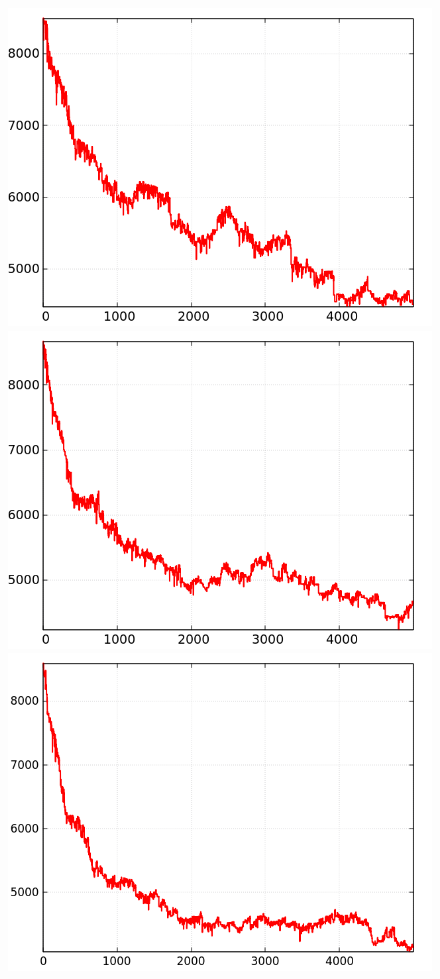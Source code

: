 \begin{figure}[H]
	\includegraphics[width=\linewidth]{benchmark/convergence/sequentialConvergence.png}
	\label{fig:sequential_convergence}
	\endminipage\hfill
	\includegraphics[width=\linewidth]{benchmark/convergence/standardConvergence.png}
	\label{fig:standard_convergence}
	\endminipage\hfill
	\includegraphics[width=\linewidth]{benchmark/convergence/fastflowConvergence.png}

\end{figure}

